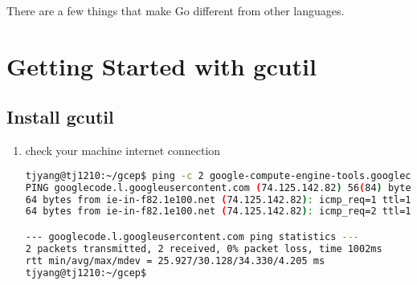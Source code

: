 \noindent{}There are a few things that make Go different from other
languages.

\section{Getting Started with gcutil}

\subsection{Install gcutil}
\begin{enumerate}
\item check your machine internet connection
  \begin{lstlisting}[language=Bash]
tjyang@tj1210:~/gcep$ ping -c 2 google-compute-engine-tools.googlecode.com
PING googlecode.l.googleusercontent.com (74.125.142.82) 56(84) bytes of data.
64 bytes from ie-in-f82.1e100.net (74.125.142.82): icmp_req=1 ttl=128 time=25.9 ms
64 bytes from ie-in-f82.1e100.net (74.125.142.82): icmp_req=2 ttl=128 time=34.3 ms

--- googlecode.l.googleusercontent.com ping statistics ---
2 packets transmitted, 2 received, 0% packet loss, time 1002ms
rtt min/avg/max/mdev = 25.927/30.128/34.330/4.205 ms
tjyang@tj1210:~/gcep$ 
  \end{lstlisting}


\end{enumerate}
